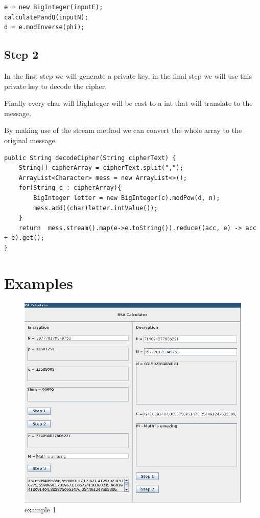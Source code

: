 \begin{lstlisting}
e = new BigInteger(inputE);
calculatePandQ(inputN);
d = e.modInverse(phi);
\end{lstlisting}{}

\subsection{Step 2}
In the first step we will generate a private key, in the final step we will use this private key to decode the cipher.

Finally every char will BigInteger will be cast to a int that will translate to the message.

By making use of the stream method we can convert the whole array to the original message.

\begin{lstlisting}
public String decodeCipher(String cipherText) {
    String[] cipherArray = cipherText.split(",");
    ArrayList<Character> mess = new ArrayList<>();
    for(String c : cipherArray){
        BigInteger letter = new BigInteger(c).modPow(d, n);
        mess.add((char)letter.intValue());
    }
    return  mess.stream().map(e->e.toString()).reduce((acc, e) -> acc  + e).get();
}
\end{lstlisting}

\section{Examples}
\begin{figure}
    \includegraphics[width=\linewidth]{images/example_1}
    \caption{example 1}
    \label{fig:boat1}
\end{figure}
